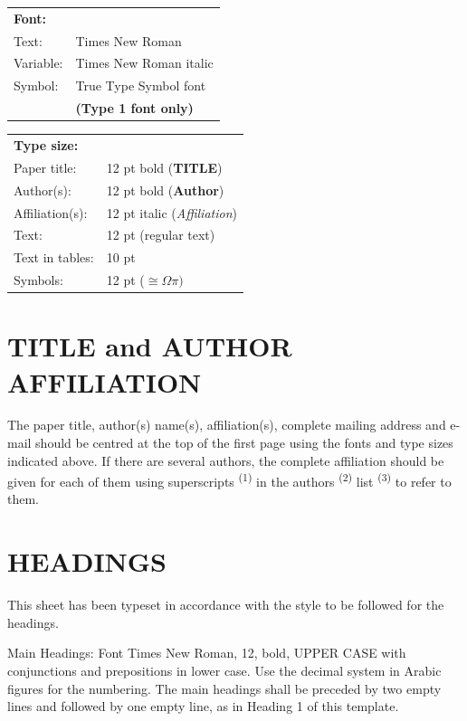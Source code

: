 \documentclass{esagnc}
\begin{document}
\begin{tabular}{ll}
\textbf{Font:}  &    \\
Text:           &   Times New Roman\\
Variable:       &   Times New Roman italic\\
Symbol:         &   True Type Symbol font\\
                &   \textbf{(Type 1 font only)}
\end{tabular}

\begin{tabular}{ll}
\textbf{Type size:}     &    \\
Paper title:            &   12 pt bold (\textbf{TITLE})\\
Author(s):              &   12 pt bold (\textbf{Author})\\
Affiliation(s):         &   12 pt italic (\textit{Affiliation})\\
Text:                   &   12 pt (regular text)\\
Text in tables:         &   10 pt\\
Symbols:                &   12 pt ($\cong\Omega\pi)$
\end{tabular}

\section{TITLE and AUTHOR AFFILIATION}

The paper title, author(s) name(s), affiliation(s), complete mailing address and e-mail should be centred at the top of the first page using the fonts and type sizes indicated above. If there are several authors, the complete affiliation should be given for each of them using superscripts \textsuperscript{(1)} in the authors \textsuperscript{(2)} list \textsuperscript{(3)} to refer to them.

\section{HEADINGS}

This sheet has been typeset in accordance with the style to be followed for the headings. 

\bigskip

Main Headings: Font Times New Roman, 12, bold, UPPER CASE with conjunctions and prepositions in lower case. Use the decimal system in Arabic figures for the numbering. The main headings shall be preceded by two empty lines and followed by one empty line, as in Heading 1 of this template.
\end{document}
